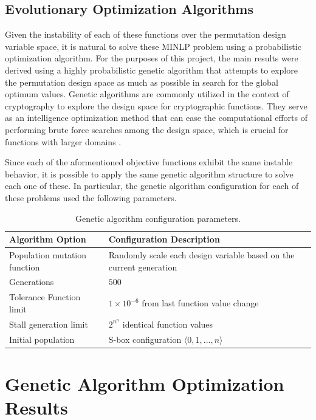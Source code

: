 \documentclass[11pt]{article}
\begin{document}

\subsection{Evolutionary Optimization Algorithms}

Given the instability of each of these functions over the permutation design variable space, it is natural to solve these MINLP problem using a probabilistic optimization algorithm. For the purposes of this project, the main results were derived using a highly probabilistic genetic algorithm that attempts to explore the permutation design space as much as possible in search for the global optimum values. Genetic algorithms are commonly utilized in the context of cryptography to explore the design space for cryptographic functions. They serve as an intelligence optimization method that can ease the computational efforts of performing brute force searches among the design space, which is crucial for functions with larger domains \cite{Skein}.

Since each of the aformentioned objective functions exhibit the same instable behavior, it is possible to apply the same genetic algorithm structure to solve each one of these. In particular, the genetic algorithm configuration for each of these problems used the following parameters.

\begin{table}
	\centering
	\caption{Genetic algorithm configuration parameters.}
    \begin{tabular}{|l|l|}
        \hline
        \textbf{Algorithm Option} & \textbf{Configuration Description} \\ \hline
        Population mutation function & Randomly scale each design variable based on the current generation \\ 
        Generations & $500$ \\ 
        Tolerance Function limit & $1 \times 10^{-6}$ from last function value change \\ 
        Stall generation limit & $2^{n^n}$ identical function values \\ 
        Initial population & S-box configuration $\langle 0, 1, ..., n \rangle$ \\
        \hline
    \end{tabular}
	\label{configTable}
\end{table}

\section{Genetic Algorithm Optimization Results}
\end{document}

